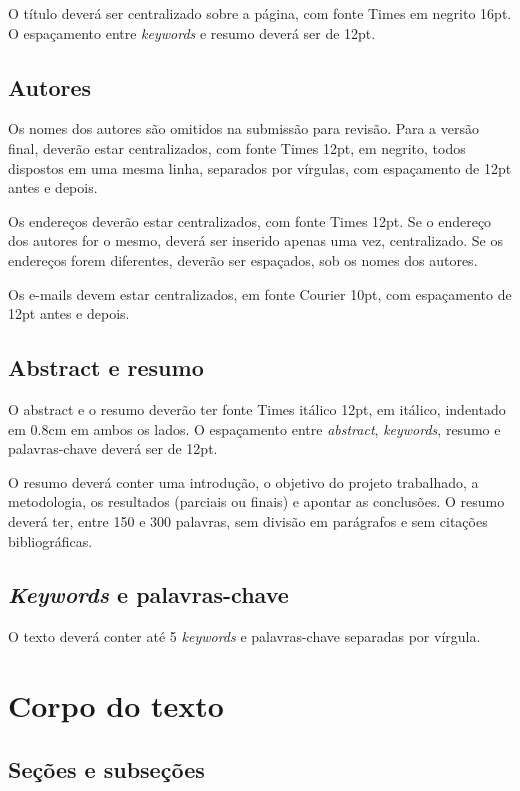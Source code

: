 \documentclass[12pt]{article}
\begin{document}
O título deverá ser centralizado sobre a página, com fonte Times em
negrito 16pt. O espaçamento entre \textit{keywords} e resumo deverá
ser de 12pt.

\subsection{Autores}
\label{sec:autores}

Os nomes dos autores são omitidos na submissão para revisão. Para a
versão final, deverão estar centralizados, com fonte Times 12pt, em
negrito, todos dispostos em uma mesma linha, separados por vírgulas,
com espaçamento de 12pt antes e depois.

Os endereços deverão estar centralizados, com fonte Times 12pt. Se o
endereço dos autores for o mesmo, deverá ser inserido apenas uma vez,
centralizado. Se os endereços forem diferentes, deverão ser espaçados,
sob os nomes dos autores.

Os e-mails devem estar centralizados, em fonte Courier 10pt, com
espaçamento de 12pt antes e depois.

\subsection{Abstract e resumo}
\label{sec:abstract-e-resumo}

O abstract e o resumo deverão ter fonte Times itálico 12pt, em
itálico, indentado em 0.8cm em ambos os lados. O espaçamento entre
\textit{abstract}, \textit{keywords}, resumo e palavras-chave deverá
ser de 12pt.

O resumo deverá conter uma introdução, o objetivo do projeto
trabalhado, a metodologia, os resultados (parciais ou finais) e
apontar as conclusões. O resumo deverá ter, entre 150 e 300 palavras,
sem divisão em parágrafos e sem citações bibliográficas.

\subsection{\textit{Keywords} e palavras-chave}
\label{sec:keywords-e-palavras}

O texto deverá conter até 5 \textit{keywords} e palavras-chave
separadas por vírgula.

\section{Corpo do texto}

\subsection{Seções e subseções}
\label{sec:secoes}
\end{document}
